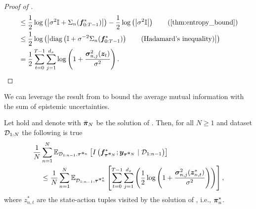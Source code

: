 \begin{proof}[Proof of ]
\begin{align*}
         &\leq \frac{1}{2}\log\left( \left\vert \sigma^2 \mathbb{I} + \Sigma_{n}(\vf^*_{0:T-1})
        \right\vert \right) - \frac{1}{2}\log\left( \left\vert \sigma^2 \mathbb{I}
        \right\vert \right) \tag{\Cref{thm:entropy_bound}}\\
         &\leq \frac{1}{2}\log\left( \left\vert \diag\left(\mathbb{I} + \sigma^{-2} \Sigma_{n}(\vf^*_{0:T-1})\right) \tag{Hadamard's inequality}
        \right\vert \right) \\
        &=  \frac{1}{2} \sum_{t=0}^{T-1} \sum^{d_x}_{j=1}\log \left(1 + \frac{\vsigma_{n, j}^2(\vz_t)}{\sigma^2}\right).
     \end{align*}
\end{proof}

We can leverage the result from   to bound the average mutual information with the sum of epistemic uncertainties.
\begin{lemma}\label{lem:average_mi_epistemic_uncertainties}
    Let  hold and denote with $\bar{{\bm{\pi}}}_N$ be the solution of .
    Then, for all $N \geq 1$ and dataset ${\mathcal{D}}_{1:N}$ the following is true
\begin{align*}
     \frac{1}{N}&\sum^{N}_{n=1} \mathbb{E}_{{\mathcal{D}}_{1:n-1}, {\bm{\tau}}^{\Bar{{\bm{\pi}}}_n}}\left[I\left({\bm{f}}^*_{{\bm{\tau}}^{\Bar{{\bm{\pi}}}_N}}; {\bm{y}}_{{\bm{\tau}}^{\Bar{{\bm{\pi}}}_N}} \mid {\mathcal{D}}_{1:n-1}\right)\right] \\
     &\leq \frac{1}{N}  \sum^{N}_{n=1} \mathbb{E}_{{\mathcal{D}}_{1:n-1}, {\bm{\tau}}^{{\bm{\pi}}_n^*}}\left[\sum_{t=0}^{T-1} \sum_{j=1}^{d_x}\left(\frac{1}{2} \log \left(1 + \frac{{\bm{\sigma}}_{n, j}^2({\bm{z}}^*_{n, t})}{\sigma^2}\right)\right)\right],
\end{align*}
where $z^*_{n, t}$ are the state-action tuples visited by the solution of , i.e., ${\bm{\pi}}^*_n$.
\end{lemma}
